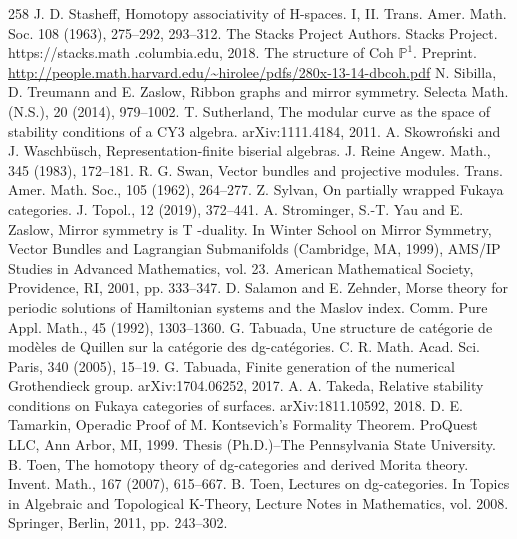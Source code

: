 \begin{thebibliography}{258}
\hypertarget{ref:229}{} J. D. Stasheff, Homotopy associativity of H-spaces. I, II. Trans. Amer. Math. Soc. 108 (1963), 275–292, 293–312.
\hypertarget{ref:230}{} The Stacks Project Authors. Stacks Project. https://stacks.math .columbia.edu, 2018.
\hypertarget{ref:231}{} The structure of Coh $\mathbb P^1$. Preprint. \url{http://people.math.harvard.edu/~hirolee/pdfs/280x-13-14-dbcoh.pdf}
\hypertarget{ref:232}{} N. Sibilla, D. Treumann and E. Zaslow, Ribbon graphs and mirror symmetry. Selecta Math. (N.S.), 20 (2014), 979–1002.
\hypertarget{ref:233}{} T. Sutherland, The modular curve as the space of stability conditions of a CY3 algebra. arXiv:1111.4184, 2011.
\hypertarget{ref:234}{} A. Skowroński and J. Waschbüsch, Representation-finite biserial algebras. J. Reine Angew. Math., 345 (1983), 172–181.
\hypertarget{ref:235}{} R. G. Swan, Vector bundles and projective modules. Trans. Amer. Math. Soc., 105 (1962), 264–277.
\hypertarget{ref:236}{} Z. Sylvan, On partially wrapped Fukaya categories. J. Topol., 12 (2019), 372–441.
\hypertarget{ref:237}{} A. Strominger, S.-T. Yau and E. Zaslow, Mirror symmetry is T -duality. In Winter School on Mirror Symmetry, Vector Bundles and Lagrangian Submanifolds (Cambridge, MA, 1999), AMS/IP Studies in Advanced Mathematics, vol. 23. American Mathematical Society, Providence, RI, 2001, pp. 333–347.
\hypertarget{ref:238}{} D. Salamon and E. Zehnder, Morse theory for periodic solutions of Hamiltonian systems and the Maslov index. Comm. Pure Appl. Math., 45 (1992), 1303–1360.
\hypertarget{ref:239}{} G. Tabuada, Une structure de catégorie de modèles de Quillen sur la catégorie des dg-catégories. C. R. Math. Acad. Sci. Paris, 340 (2005), 15–19.
\hypertarget{ref:240}{} G. Tabuada, Finite generation of the numerical Grothendieck group. arXiv:1704.06252, 2017.
\hypertarget{ref:241}{} A. A. Takeda, Relative stability conditions on Fukaya categories of surfaces. arXiv:1811.10592, 2018.
\hypertarget{ref:242}{} D. E. Tamarkin, Operadic Proof of M. Kontsevich’s Formality Theorem. ProQuest LLC, Ann Arbor, MI, 1999. Thesis (Ph.D.)–The Pennsylvania State University.
\hypertarget{ref:243}{} B. Toen, The homotopy theory of dg-categories and derived Morita theory. Invent. Math., 167 (2007), 615–667.
\hypertarget{ref:244}{} B. Toen, Lectures on dg-categories. In Topics in Algebraic and Topological K-Theory, Lecture Notes in Mathematics, vol. 2008. Springer, Berlin, 2011, pp. 243–302.

\end{thebibliography}
